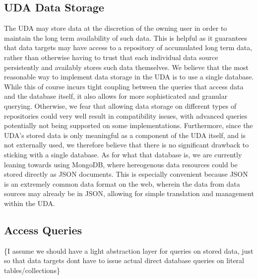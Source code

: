 \subsection{UDA Data Storage}
The UDA may store data at the discretion of the owning user in order to maintain the long term availability of such data. This is helpful as it guarantees that data targets may have access to a repository of accumulated long term data, rather than otherwise having to trust that each individual data source persistently and availably stores such data themselves. We believe that the most reasonable way to implement data storage in the UDA is to use a single database. While this of course incurs tight coupling between the queries that access data and the database itself, it also allows for more sophisticated and granular querying. Otherwise, we fear that allowing data storage on different types of repositories could very well result in compatibility issues, with advanced queries potentially not being supported on some implementations. Furthermore, since the UDA's stored data is only meaningful as a component of the UDA itself, and is not externally used, we therefore believe that there is no significant drawback to sticking with a single database. As for what that database is, we are currently leaning towards using MongoDB, where hereogenous data resources could be stored directly as JSON documents. This is especially convenient because JSON is an extremely common data format on the web, wherein the data from data sources may already be in JSON, allowing for simple translation and management within the UDA.

\subsection{Access Queries}
\{I assume we should have a light abstraction layer for queries on stored data, just so that data targets dont have to issue actual direct database queries on literal tables/collections\}